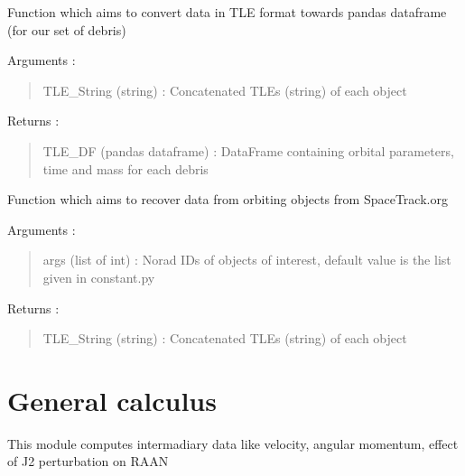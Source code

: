 \documentclass[letterpaper,10pt,english]{sphinxmanual}
\begin{document}
\begin{fulllineitems}
\label{\detokenize{utils:utils.debris_data_loader.convertTLEtoDF}}
Function which aims to convert data in TLE format towards pandas dataframe (for our set of debris)

Arguments :
\begin{quote}

TLE\_String (string) : Concatenated TLEs (string) of each object
\end{quote}

Returns :
\begin{quote}

TLE\_DF (pandas dataframe) : DataFrame containing orbital parameters, time and mass for each debris
\end{quote}

\end{fulllineitems}


\begin{fulllineitems}
\label{\detokenize{utils:utils.debris_data_loader.recoveringDebrisData}}
Function which aims to recover data from orbiting objects from Space\sphinxhyphen{}Track.org

Arguments :
\begin{quote}

args (list of int) : Norad IDs of objects of interest, default value is the list given in constant.py
\end{quote}

Returns :
\begin{quote}

TLE\_String (string) : Concatenated TLEs (string) of each object
\end{quote}

\end{fulllineitems}



\section{General calculus}
\label{\detokenize{utils:general-calculus}}\label{\detokenize{utils:module-utils.general_calculus}}
This module computes intermadiary data like velocity, 
angular momentum, effect of J2 perturbation on RAAN
\end{document}
